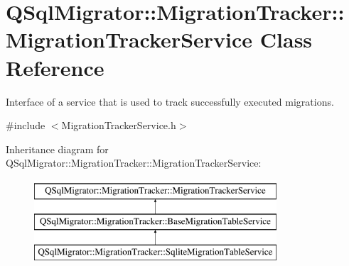 \hypertarget{class_q_sql_migrator_1_1_migration_tracker_1_1_migration_tracker_service}{}\section{Q\+Sql\+Migrator\+:\+:Migration\+Tracker\+:\+:Migration\+Tracker\+Service Class Reference}
\label{class_q_sql_migrator_1_1_migration_tracker_1_1_migration_tracker_service}


Interface of a service that is used to track successfully executed migrations.  




{\ttfamily \#include $<$Migration\+Tracker\+Service.\+h$>$}

Inheritance diagram for Q\+Sql\+Migrator\+:\+:Migration\+Tracker\+:\+:Migration\+Tracker\+Service\+:\begin{figure}[H]
\begin{center}
\leavevmode
\includegraphics[height=3.000000cm]{class_q_sql_migrator_1_1_migration_tracker_1_1_migration_tracker_service}
\end{center}
\end{figure}
